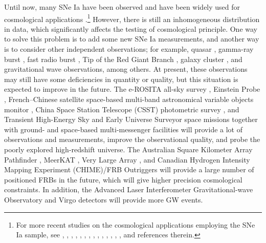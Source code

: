 \documentclass{aa}
\begin{document}
Until now, many SNe Ia have been observed and have been widely used for cosmological applications \citep{2018ApJ...854...46H,2021PhRvD.104l3511P,2023MNRAS.526.1482C,2022A&A...661A..71H,2022PhRvD.106f3515W,2023MNRAS.522.6024B}.\footnote{For more recent studies on the cosmological applications employing the SNe Ia sample, see \citet{2023MNRAS.521.3909B}, \citet{2023PhRvD.107j3521C}, \citet{2023arXiv230517243D}, \citet{2023PhRvD.108h3024H}, \citet{2023ChPhC..47f5104J}, \citet{2023arXiv231003509K}, \citet{2023arXiv231006028L}, \citet{2023ApJ...956..130M}, \citet{2023PDU....4001216O}, \citet{2023PDU....4001224P}, \citet{2023MNRAS.520.5110P}, \citet{2023PhRvD.108h3519S}, \citet{2023arXiv230504946V}, \citet{2023EPJC...83..859W}, and references therein.} However, there is still an inhomogeneous distribution in data, which significantly affects the testing of cosmological principle. One way to solve this problem is to add some new SNe Ia measurements, and another way is to consider other independent observations; for example, quasar \citep{2016ApJ...819..154L,2017FrASS...4...68B,2017A&A...602A..79L,2019NatAs...3..272R,2022MNRAS.516.1721C,2022MNRAS.515.3729K,2023PhLB..84538166L,2023arXiv230508179Z}, gamma-ray burst \citep[GRB;][]{2015NewAR..67....1W,2020MNRAS.496.1530S,2021MNRAS.507..730H,2022MNRAS.510.2928C,2022ApJ...935....7L,2022Univ....8..344L,2022ApJ...941...84L,2022ApJ...924...97W}, fast radio burst \citep[FRB;][]{2022MNRAS.511..662H,2022MNRAS.515L...1W,2022MNRAS.516.4862J,2022arXiv221213433Z,2023arXiv230708285G,2023ApJ...946L..49L}, Tip of the Red Giant Branch \citep[TRGB;][]{2019ApJ...882...34F,2020ApJ...891...57F,2021ApJ...919...16F}, galaxy cluster \citep{2017A&A...597A.120J,2020A&A...636A..15M,2021AA...649A.151M}, and gravitational wave \citep[GW;][]{2017Natur.551...85A,2018Natur.562..545C,2023ChPhC..47f5104J,2023ApJ...943...13W} observations, among others. At present, these observations may still have some deficiencies in quantity or quality, but this situation is expected to improve in the future. The e-ROSITA all-sky survey \citep{2012arXiv1209.3114M,2012SPIE.8443E..1RP,2013A&A...558A..89K,2020FrASS...7....8L}, Einstein Probe \citep[EP;][]{Yuan2015}, French--Chinese satellite space-based multi-band astronomical variable objects monitor \citep[SVOM;][]{Wei2016}, China Space Station Telescope (CSST) photometric survey \citep{2022MNRAS.515.5587X,2023MNRAS.519.1132M,2023SCPMA..6629511L}, and Transient High-Energy Sky and Early Universe Surveyor \citep[THESEUS;][]{Amati2018} space missions together with ground- and space-based multi-messenger facilities will provide a lot of observations and measurements, improve the observational quality, and probe the poorly explored high-redshift universe. The Australian Square Kilometer Array Pathfinder \citep[ASKAP;][]{2017ASPC..512...73C}, MeerKAT \citep{2018IAUS..337..406S}, Very Large Array \citep[VLA;][]{2018ApJS..236....8L}, and Canadian Hydrogen Intensity Mapping Experiment (CHIME)/FRB Outriggers \citep{2021AJ....161...81L} will provide a large number of positioned FRBs in the future, which will give higher precision cosmological constraints. In addition, the Advanced Laser Interferometer Gravitational-wave Observatory \citep[aLIGO;][]{2015CQGra..32g4001L} and Virgo \citep{2015CQGra..32b4001A} detectors will provide more GW events. 
\end{document}

